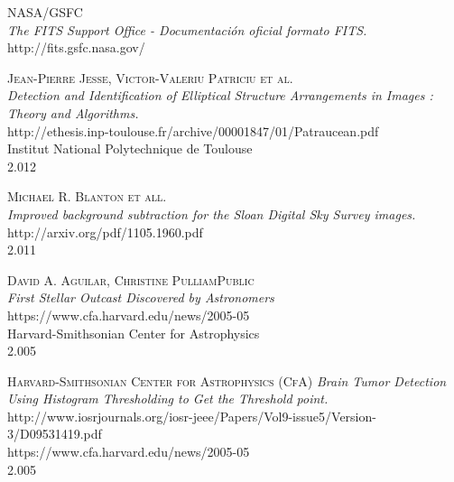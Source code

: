 \begin{thebibliography}{1}
  		\textsc{NASA/GSFC} \\
  		\textit{The FITS Support Office - Documentación oficial formato FITS.}
  		\\http://fits.gsfc.nasa.gov/
	  	  		
	  	\textsc{ Jean-Pierre Jesse, Victor-Valeriu Patriciu et al.} \\
	  	\textit{Detection and Identification of Elliptical Structure Arrangements in Images : Theory and Algorithms.}
	  	\\http://ethesis.inp-toulouse.fr/archive/00001847/01/Patraucean.pdf
	  	\\Institut National Polytechnique de Toulouse
	  	\\2.012
	  	
	  	\textsc{Michael R. Blanton et all.} \\
	  	\textit{Improved background subtraction for the Sloan Digital Sky Survey images.}
	  	\\http://arxiv.org/pdf/1105.1960.pdf 
	  	\\2.011
	  		  	

	  	\textsc{ David A. Aguilar, Christine PulliamPublic } \\
	  	\textit{First Stellar Outcast Discovered by Astronomers}
	  	\\https://www.cfa.harvard.edu/news/2005-05
	  	\\Harvard-Smithsonian Center for Astrophysics
	  	\\2.005
	  	
	  	\textsc{ Harvard-Smithsonian Center for Astrophysics (CfA) } 
	  	\textit{Brain Tumor Detection Using Histogram Thresholding to Get the Threshold point.}
	  	\\http://www.iosrjournals.org/iosr-jeee/Papers/Vol9-issue5/Version-3/D09531419.pdf
	  	\\https://www.cfa.harvard.edu/news/2005-05
	  	\\2.005
	\end{thebibliography}
